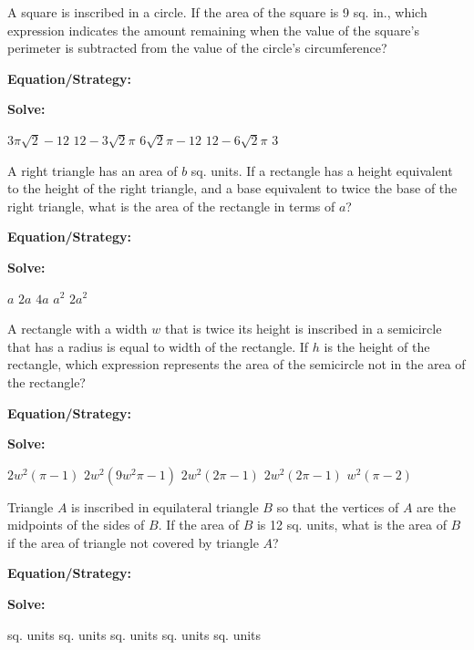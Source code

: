\vfill
\newpage
\begin{multicols*}{2}
\begin{outline}[enumerate]
\medium

\1 A square is inscribed in a circle. If the area of the square is 9 sq. in., which expression indicates the amount remaining when the value of the square's perimeter is subtracted from the value of the circle's circumference?

\bigskip
\textbf{Equation/Strategy:} \hrulefill

\bigskip
\textbf{Solve:}

\vfill
\2 $3\pi\sqrt{2}-12$
\2 $12-3\sqrt{2}\pi$
\2 $6\sqrt{2}\pi-12$
\2 $12-6\sqrt{2}\pi$
\2 $3$

\midline

\1 A right triangle has an area of $b$ sq. units. If a rectangle has a height equivalent to the height of the right triangle, and a base equivalent to twice the base of the right triangle, what is the area of the rectangle in terms of $a$?

\bigskip
\textbf{Equation/Strategy:} \hrulefill

\bigskip
\textbf{Solve:}

\vfill
\2 $a$
\2 $2a$
\2 $4a$
\2 $a^2$
\2 $2a^2$

\columnbreak
\advanced

\1 A rectangle with a width $w$ that is twice its height is inscribed in a semicircle that has a radius is equal to width of the rectangle. If $h$ is the height of the rectangle, which expression represents the area of the semicircle not in the area of the rectangle?

\bigskip
\textbf{Equation/Strategy:} \hrulefill

\bigskip
\textbf{Solve:}

\vfill
\2 $2w^2(\pi-1)$
\2 $2w^2(9w^2\pi-1)$
\2 $2w^2(2\pi-1)$
\2 $2w^2(2\pi-1)$
\2 $w^2(\pi-2)$

\midline

\1 Triangle $A$ is inscribed in equilateral triangle $B$ so that the vertices of $A$ are the midpoints of the sides of $B$. If the area of $B$ is 12 sq. units, what is the area of $B$ if the area of triangle not covered by triangle $A$?

\bigskip
\textbf{Equation/Strategy:}

\bigskip
\textbf{Solve:}

\vfill
{} sq. units
 sq. units
 sq. units
 sq. units
 sq. units
\end{outline}
\end{multicols*}